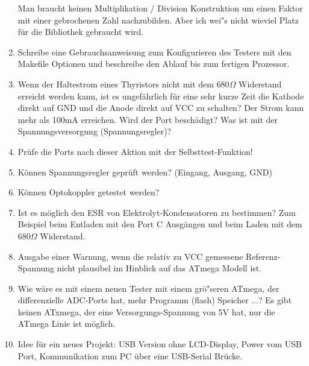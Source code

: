 \begin{enumerate}
Man braucht keinen Multiplikation / Division Konstruktion um einen Faktor mit einer gebrochenen Zahl nachzubilden.
Aber ich wei"s nicht wieviel Platz f\"ur die Bibliothek gebraucht wird.
\item Schreibe eine Gebrauchsanweisung zum Konfigurieren des Testers mit den Makefile Optionen und beschreibe
den Ablauf bis zum fertigen Prozessor.
\item Wenn der Haltestrom eines Thyristors nicht mit dem \(680\Omega\) Widerstand erreicht werden kann, 
ist es ungef\"ahrlich f\"ur eine sehr kurze Zeit die Kathode direkt auf GND und die Anode direkt auf VCC zu schalten?
Der Strom kann mehr als 100mA erreichen. Wird der Port besch\"adigt? Was ist mit der Spannungsversorgung (Spannungsregler)?
\item Pr\"ufe die Ports nach dieser Aktion mit der Selbsttest-Funktion!
\item K\"onnen Spannungsregler gepr\"uft werden? (Eingang, Ausgang, GND)
\item K\"onnen Optokoppler getestet werden?
\item Ist es m\"oglich den ESR von Elektrolyt-Kondensatoren zu bestimmen? Zum Beispiel beim Entladen mit den Port C Ausg\"angen und beim
Laden mit dem \(680\Omega\) Widerstand.
\item Ausgabe einer Warnung, wenn die relativ zu VCC gemessene Referenz-Spannung nicht plausibel im Hinblick auf das ATmega Modell ist.
\item Wie w\"are es mit einem neuen Tester mit einem gr\"o"seren ATmega, der differenzielle ADC-Ports hat,
mehr Programm (flash) Speicher ...?
Es gibt keinen ATxmega, der eine Versorgungs-Spannung von 5V hat, nur die ATmega Linie ist m\"oglich.
\item Idee f\"ur ein neues Projekt: USB  Version ohne LCD-Display, Power vom USB Port, Kommunikation zum PC \"uber eine USB-Serial Br\"ucke.
\end{enumerate}
